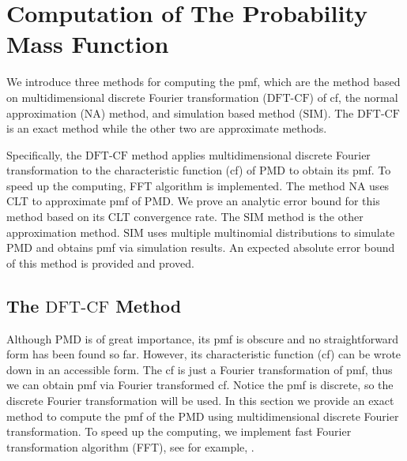 \documentclass[12pt]{article}
\newcommand{\PMD}{\textrm{PMD}}
\newcommand{\SIM}{{\textrm{SIM}}}
\newcommand{\NA}{{\textrm{NA}}}
\newcommand{\dft}{{\textrm{DFT-CF}}}
\begin{document}
\section{Computation of The Probability Mass Function} \label{sec:cmpt.pmf}
We introduce three methods for computing the pmf, which are the method based on multidimensional discrete Fourier transformation ($\dft$) of cf, the normal approximation ($\NA$) method, and simulation based method ($\SIM$). The $\dft$ is an exact method while the other two are approximate methods.

Specifically, the $\dft$ method applies multidimensional discrete Fourier transformation to the characteristic function (cf) of $\PMD$ to obtain its pmf. To speed up the computing, FFT algorithm is implemented. The method $\NA$ uses CLT to approximate pmf of $\PMD$. We prove an analytic error bound for this method based on its CLT convergence rate. The $\SIM$ method is the other approximation method. $\SIM$ uses multiple multinomial distributions to simulate $\PMD$ and obtains pmf via simulation results. An expected absolute error bound of this method is provided and proved.

\subsection{The $\dft$ Method}
Although $\PMD$ is of great importance, its pmf is obscure and no straightforward form has been found so far. However, its characteristic function (cf) can be wrote down in an accessible form. The cf is just a Fourier transformation of pmf, thus we can obtain pmf via Fourier transformed cf. Notice the pmf is discrete, so the discrete Fourier transformation will be used. In this section we provide an exact method to compute the pmf of the PMD using multidimensional discrete Fourier transformation. To speed up the computing, we implement fast Fourier transformation algorithm (FFT), see for example, .
\end{document}
